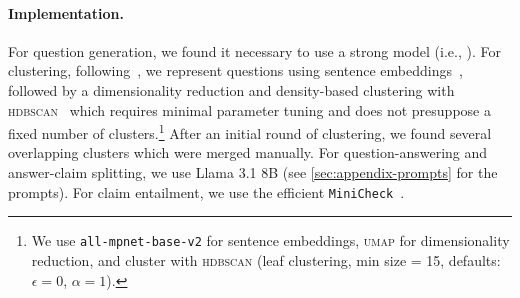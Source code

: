 \paragraph{Implementation.}
For question generation, we found it necessary to use a strong model (i.e., \gpt).
For clustering, following~\citet{Lam:2024:CHI}, we represent questions using sentence embeddings~\cite{Reimers:2019:EMNLP}, followed by a dimensionality reduction and density-based clustering with \textsc{hdbscan}~\cite{McInnes:2017:JOSS} which requires minimal parameter tuning and does not presuppose a fixed number of clusters.\footnote{
    We use \texttt{all-mpnet-base-v2} for sentence embeddings, \textsc{umap} for dimensionality reduction, and cluster with \textsc{hdbscan} (leaf clustering, min size = 15, defaults: $\epsilon=0$, $\alpha=1$).
}
After an initial round of clustering, we found several overlapping clusters which were merged manually.
For question-answering and answer-claim splitting, we use Llama 3.1 8B (see \cref{sec:appendix-prompts} for the prompts).
For claim entailment, we use the efficient \texttt{\small MiniCheck}~\cite{Tang:2024:EMNLP}.
